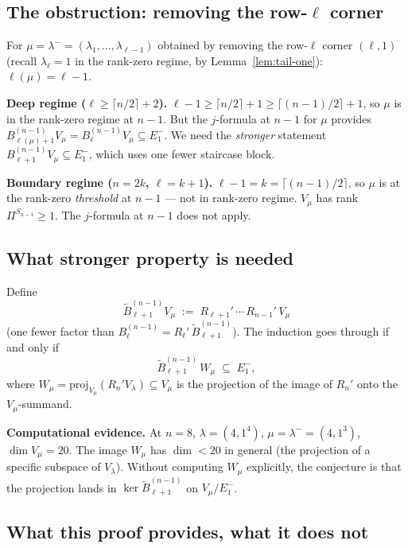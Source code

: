 \documentclass[11pt]{article}
\theoremstyle{definition}
\begin{document}
\subsection{The obstruction: removing the row-$\ell$ corner}

For $\mu=\lambda^-=(\lambda_1,\ldots,\lambda_{\ell-1})$ obtained by
removing the row-$\ell$ corner $(\ell,1)$ (recall $\lambda_\ell=1$ in
the rank-zero regime, by Lemma~\ref{lem:tail-one}): $\ell(\mu)=\ell-1$.

\textbf{Deep regime ($\ell\ge\lceil n/2\rceil+2$).}
$\ell-1\ge\lceil n/2\rceil+1\ge\lceil(n-1)/2\rceil+1$, so $\mu$ is in
the rank-zero regime at $n-1$.  But the $j$-formula at $n-1$ for
$\mu$ provides $B_{\ell(\mu)+1}^{(n-1)}V_\mu = B_\ell^{(n-1)}V_\mu
\subseteq E_1^-$.  We need the \emph{stronger} statement
$B_{\ell+1}^{(n-1)}V_\mu \subseteq E_1^-$, which uses one fewer
staircase block.

\textbf{Boundary regime ($n=2k$, $\ell=k+1$).}  $\ell-1=k=
\lceil(n-1)/2\rceil$, so $\mu$ is at the rank-zero \emph{threshold}
at $n-1$ --- not in rank-zero regime.  $V_\mu$ has rank
$\Pi^{S_{n-1}}\ge 1$.  The $j$-formula at $n-1$ does not apply.

\subsection{What stronger property is needed}

Define
\[
   \widetilde B_{\ell+1}^{(n-1)}V_\mu \;:=\; R_{\ell+1}'\,\cdots\,R_{n-1}'\,V_\mu
\]
(one fewer factor than $B_\ell^{(n-1)}=R_\ell'\,\widetilde B_{\ell+1}^{(n-1)}$).
The induction goes through if and only if
\begin{equation}\label{eq:strong}
   \widetilde B_{\ell+1}^{(n-1)}\,W_\mu \;\subseteq\; E_1^-,
\end{equation}
where $W_\mu = \mathrm{proj}_{V_\mu}(R_n' V_\lambda) \subseteq V_\mu$
is the projection of the image of $R_n'$ onto the $V_\mu$-summand.

\textbf{Computational evidence.}  At $n=8$, $\lambda=(4,1^4)$,
$\mu=\lambda^-=(4,1^3)$, $\dim V_\mu=20$.  The image $W_\mu$ has
$\dim < 20$ in general (the projection of a specific subspace of
$V_\lambda$).  Without computing $W_\mu$ explicitly, the conjecture is
that the projection lands in $\ker\widetilde B_{\ell+1}^{(n-1)}$ on
$V_\mu/E_1^-$.

\subsection{What this proof provides, what it does not}
\end{document}
